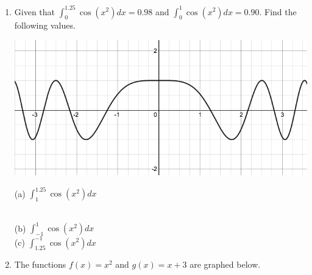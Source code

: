 \documentclass[12pt]{article}
\begin{document}
\begin{enumerate}
\begin{minipage}{0.6\textwidth}
(b) $\displaystyle \int_{5}^{10}f\left(x\right)dx$\\

(c) $\displaystyle \int_{-10}^{-5}f\left(x\right)dx$\\

(d) $\displaystyle \int_{-5}^{-10}f\left(x\right)dx$\\

\end{minipage}
\vfill
\newpage
~
\item Given that $\displaystyle \int_{0}^{1.25}\cos\left(x^{2}\right)dx=0.98$ and $\displaystyle \int_{0}^{1}\cos\left(x^{2}\right)dx=0.90$. Find the following values.\\
\noindent\begin{minipage}{0.3\textwidth}%
\includegraphics [scale=.4]{5_4_cos}
\end{minipage}%
\hspace{60mm}
\begin{minipage}{0.6\textwidth}
(a) $\displaystyle \int_{1}^{1.25}\cos\left(x^{2}\right)dx$\\\

(b) $\displaystyle \int_{-1}^{1}\cos\left(x^{2}\right)dx$\\

(c) $\displaystyle \int_{1.25}^{-1}\cos\left(x^{2}\right)dx$\\

\end{minipage}
\vfill

\item The functions $\displaystyle f\left(x\right)=x^{2}$ and $\displaystyle g\left(x\right)=x+3$ are graphed below. \\
	

\end{enumerate}
\end{document}
